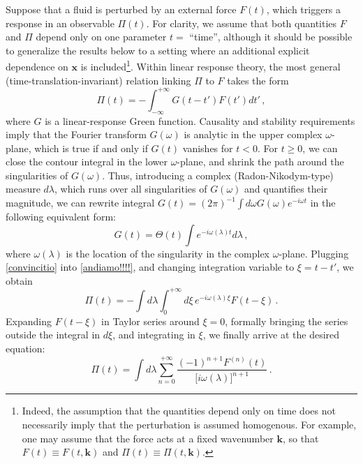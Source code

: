 \documentclass[a4paper, amsfonts, amssymb, amsmath, reprint, showkeys, twoside,notitlepage]{revtex4-2}
\begin{document}
Suppose that a fluid is perturbed by an external force $F(t)$, which triggers a response in an observable $\Pi(t)$. For clarity, we assume that both quantities $F$ and $\Pi$ depend only on one parameter $t= \, \,$``time'', although it should be possible to generalize the results below to a setting where an additional explicit dependence on $\textbf{x}$ is included\footnote{Indeed, the assumption that the quantities depend only on time does not necessarily imply that the perturbation is assumed homogenous. For example, one may assume that the force acts at a fixed wavenumber $\textbf{k}$, so that $F(t)\equiv F(t,\textbf{k})$ and $\Pi(t)\equiv \Pi(t,\textbf{k})$.}. Within linear response theory, the most general (time-translation-invariant) relation linking $\Pi$ to $F$ takes the form
\begin{equation}\label{andiamo!!!!}
    \Pi(t)= -\int_{-\infty}^{+\infty} G(t-t') F(t') dt' \, ,
\end{equation}
where $G$ is a linear-response Green function. Causality and stability requirements \cite{jackson_classical_1999,HellerBounds2023,GavassinoBounds2023} imply that the Fourier transform $G(\omega)$ is analytic in the upper complex $\omega$-plane, which is true if and only if $G(t)$ vanishes for $t < 0$. For $t \geq 0$, we can close the contour integral in the lower $\omega$-plane, and shrink the path around the singularities of $G(\omega)$. Thus, introducing a complex (Radon-Nikodym-type) measure $d\lambda$, which runs over all singularities of $G(\omega)$ and quantifies their magnitude, we can rewrite integral $G(t)=(2\pi)^{-1}\int d\omega G(\omega) e^{-i\omega t}$ in the following equivalent form:
\begin{equation}\label{convincitio}
    G(t)=\Theta(t) \int e^{-i\omega(\lambda) t}d\lambda \, ,
\end{equation}
where $\omega(\lambda)$ is the location of the singularity in the complex $\omega$-plane. Plugging \eqref{convincitio} into \eqref{andiamo!!!!}, and changing integration variable to $\xi=t-t'$, we obtain
\begin{equation}
\Pi(t)=-\int d\lambda \int_0^{+\infty} d\xi \, e^{-i\omega(\lambda)\xi}F(t-\xi) \, .    
\end{equation}
Expanding $F(t-\xi)$ in Taylor series around $\xi=0$, formally bringing the series outside the integral in $d\xi$, and integrating in $\xi$, we finally arrive at the desired equation:
\begin{equation}\label{labone}
\Pi(t) = \int d\lambda \sum_{n=0}^{+\infty} \dfrac{(-1)^{n+1} F^{(n)}(t)}{\big[ i\omega(\lambda)\big]^{n+1}}  \, .  
\end{equation}
\end{document}

